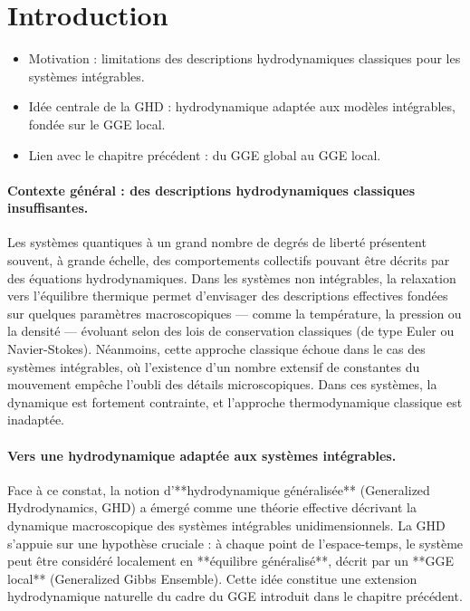 
\section*{Introduction}

{\color{blue}
\begin{itemize}
    \item Motivation : limitations des descriptions hydrodynamiques classiques pour les systèmes intégrables.
    \item Idée centrale de la GHD : hydrodynamique adaptée aux modèles intégrables, fondée sur le GGE local.
    \item Lien avec le chapitre précédent : du GGE global au GGE local.
\end{itemize}
}

\paragraph{Contexte général : des descriptions hydrodynamiques classiques insuffisantes.}
Les systèmes quantiques à un grand nombre de degrés de liberté présentent souvent, à grande échelle, des comportements collectifs pouvant être décrits par des équations hydrodynamiques. Dans les systèmes non intégrables, la relaxation vers l’équilibre thermique permet d’envisager des descriptions effectives fondées sur quelques paramètres macroscopiques — comme la température, la pression ou la densité — évoluant selon des lois de conservation classiques (de type Euler ou Navier-Stokes). Néanmoins, cette approche classique échoue dans le cas des systèmes intégrables, où l’existence d’un nombre extensif de constantes du mouvement empêche l’oubli des détails microscopiques. Dans ces systèmes, la dynamique est fortement contrainte, et l’approche thermodynamique classique est inadaptée.

\paragraph{Vers une hydrodynamique adaptée aux systèmes intégrables.}
Face à ce constat, la notion d’**hydrodynamique généralisée** (Generalized Hydrodynamics, GHD) a émergé comme une théorie effective décrivant la dynamique macroscopique des systèmes intégrables unidimensionnels. La GHD s’appuie sur une hypothèse cruciale : à chaque point de l’espace-temps, le système peut être considéré localement en **équilibre généralisé**, décrit par un **GGE local** (Generalized Gibbs Ensemble). Cette idée constitue une extension hydrodynamique naturelle du cadre du GGE introduit dans le chapitre précédent.

